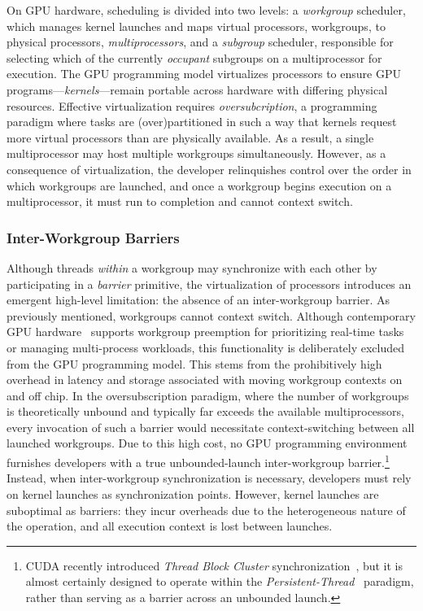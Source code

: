 \documentclass[sigconf]{acmart}
\begin{document}
On GPU hardware, scheduling is divided into two levels: a \emph{workgroup} scheduler, which manages kernel launches and maps virtual processors, workgroups, to physical processors, \emph{multiprocessors}, and a \emph{subgroup} scheduler, responsible for selecting which of the currently \emph{occupant} subgroups on a multiprocessor for execution. The GPU programming model virtualizes processors to ensure GPU programs---\emph{kernels}---remain portable across hardware with differing physical resources. Effective virtualization requires \emph{oversubcription}, a programming paradigm where tasks are (over)partitioned in such a way that kernels request more virtual processors than are physically available. As a result, a single multiprocessor may host multiple workgroups simultaneously. However, as a consequence of virtualization, the developer relinquishes control over the order in which workgroups are launched, and once a workgroup begins execution on a multiprocessor, it must run to completion and cannot context switch.

\subsubsection{Inter-Workgroup Barriers}
Although threads \emph{within} a workgroup may synchronize with each other by participating in a \emph{barrier} primitive, the virtualization of processors introduces an emergent high-level limitation: the absence of an inter-workgroup barrier. As previously mentioned, workgroups cannot context switch. Although contemporary GPU hardware~\cite{} supports workgroup preemption for prioritizing real-time tasks or managing multi-process workloads, this functionality is deliberately excluded from the GPU programming model. This stems from the prohibitively high overhead in latency and storage associated with moving workgroup contexts on and off chip. In the oversubscription paradigm, where the number of workgroups is theoretically unbound and typically far exceeds the available multiprocessors, every invocation of such a barrier would necessitate context-switching between all launched workgroups. Due to this high cost, no GPU programming environment furnishes developers with a true unbounded-launch inter-workgroup barrier.\footnote{CUDA recently introduced \emph{Thread Block Cluster} synchronization~\cite{}, but it is almost certainly designed to operate within the \emph{Persistent-Thread}~\cite{} paradigm, rather than serving as a barrier across an unbounded launch.} Instead, when inter-workgroup synchronization is necessary, developers must rely on kernel launches as synchronization points. However, kernel launches are suboptimal as barriers: they incur overheads due to the heterogeneous nature of the operation, and all execution context is lost between launches.
\end{document}
